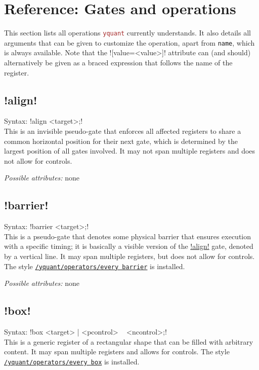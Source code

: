 \documentclass{scrartcl}
\def\pkg#1{\textcolor{brown}{\texttt{#1}}}
\def\style#1{\hyperref[style:#1]{\texttt{#1}}}
\def\Yquant{\pkg{yquant}}
\begin{document}
   
   \section{Reference: Gates and operations}\label{sec:gates}
      This section lists all operations \Yquant{} currently understands.
      It also details all arguments that can be given to customize the operation, apart from \texttt{name}, which is always available.
      Note that the \tex![value=<value>]! attribute can (and should) alternatively be given as a braced expression that follows the name of the register.
      
      \subsection{\texorpdfstring{\yquant!align!}{align}}\label{gate:align}
         Syntax: \yquant!align <target>;! \\
         This is an invisible pseudo\hyp gate that enforces all affected registers to share a common horizontal position for their next gate, which is determined by the largest position of all gates involved.
         It may not span multiple registers and does not allow for controls.
         
         \emph{Possible attributes:} none
      
      \subsection{\texorpdfstring{\yquant!barrier!}{barrier}}\label{gate:barrier}
         Syntax: \yquant!barrier <target>;! \\
         This is a pseudo\hyp gate that denotes some physical barrier that ensures execution with a specific timing; it is basically a visible version of the \hyperref[gate:align]{\yquant!align!} gate, denoted by a vertical line.
         It may span multiple registers, but does not allow for controls.
         The style \style{/yquant/operators/every barrier} is installed.
         
         \emph{Possible attributes:} none
         
      \subsection{\texorpdfstring{\yquant!box!}{box}}\label{gate:box}
         Syntax: \yquant!box <target> | <pcontrol> ~ <ncontrol>;! \\
         This is a generic register of a rectangular shape that can be filled with arbitrary content.
         It may span multiple registers and allows for controls.
         The style \style{/yquant/operators/every box} is installed.
         
\end{document}
